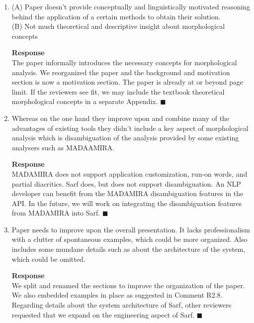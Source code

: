 \begin{enumerate}[leftmargin=0mm,label=\bfseries CommentR2.\arabic*]
\item \label{Review.2.1} 
(A) Paper doesn't provide conceptually and linguistically  motivated reasoning  behind the application of a certain methods to obtain their solution. \\
(B) Not much theoretical and descriptive insight about morphological concepts

\textbf{Response}\\
The paper informally introduces the necessary concepts for morphological analysis. 
We reorganized the paper and the background and motivation section is now a motivation section. 
The paper is already at or beyond page limit. 
If the reviewers see fit, we may include the textbook theoretical morphological concepts in a separate Appendix. 
$\blacksquare$

\item \label{Review.2.2}
Whereas on the one hand  they improve upon and combine many of the advantages of existing tools they didn't include a key aspect of morphological analysis which is disambiguation of the analysis provided by some existing analysers such as MADAAMIRA.

\textbf{Response}\\
%
MADAMIRA does not support application customization, run-on words, and partial diacritics. 
Sarf does, but does not support disambiguation. 
An NLP developer can benefit from the MADAMIRA disambiguation features in the API. 
In the future, we will work on integrating the disambiguation features from MADAMIRA into Sarf. 
$\blacksquare$

\item \label{Review.2.3}
Paper needs to improve upon the overall presentation. 
It lacks professionalism with a clutter of spontaneous examples, which could be more organized. 
Also includes some mundane details such as about the architecture of the system, which could be omitted.

\textbf{Response}\\
We split and renamed the sections to improve the organization of the paper. 
We also embedded examples in place as suggested in Comment R2.8.
Regarding details about the system architecture of Sarf, 
other reviewers requested that we expand on the engineering aspect 
of Sarf.
$\blacksquare$



\end{enumerate}
